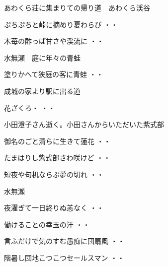 \vspace{0.6cm}
あわくら荘に集まりての帰り道　あわくら渓谷
\begin{shiika}ぷちぷちと峠に摘めり夏わらび
\hfill{・・}\end{shiika}
\begin{shiika}木苺の酢っぱ甘さや渓流に
\hfill{・・}\end{shiika}
\vspace{0.6cm}
水無瀬　庭に年々の青蛙
\begin{shiika}塗りかへて狭庭の客に青蛙
\hfill{・・}\end{shiika}
\vspace{0.6cm}
成城の家より駅に出る道
\begin{shiika}花ざくろ・
\hfill{・・}\end{shiika}
\vspace{0.6cm}
小田澄子さん逝く。小田さんからいただいた紫式部
\begin{shiika}御名のごと清らに生きて蓮花
\hfill{・・}\end{shiika}
\begin{shiika}たまはりし紫式部さわ咲けど
\hfill{・・}\end{shiika}
\begin{shiika}短夜や句机ならぶ夢の切れ
\hfill{・・}\end{shiika}
\vspace{0.6cm}
水無瀬
\begin{shiika}夜濯ぎて一日終りぬ恙なく
\hfill{・・}\end{shiika}
\vspace{0.6cm}
\begin{shiika}働けることの幸玉の汗
\hfill{・・}\end{shiika}
\vspace{0.6cm}
\begin{shiika}言ふだけで気のすむ愚痴に団扇風
\hfill{・・}\end{shiika}
\vspace{0.6cm}
\begin{shiika}階暑し団地こつこつセールスマン
\hfill{・・}\end{shiika}
\vspace{0.6cm}

